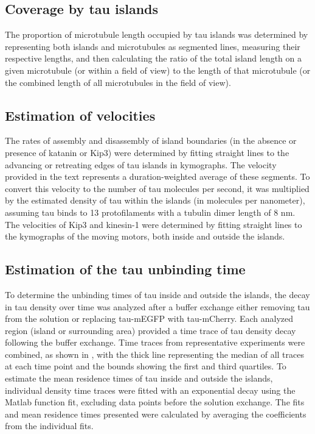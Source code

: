 \subsection{Coverage by tau islands}
The proportion of microtubule length occupied by tau islands was determined by representing both islands and microtubules as segmented lines, measuring their respective lengths, and then calculating the ratio of the total island length on a given microtubule (or within a field of view) to the length of that microtubule (or the combined length of all microtubules in the field of view).

\subsection{Estimation of velocities}
The rates of assembly and disassembly of island boundaries (in the absence or presence of katanin or Kip3) were determined by fitting straight lines to the advancing or retreating edges of tau islands in kymographs. The velocity provided in the text represents a duration-weighted average of these segments. To convert this velocity to the number of tau molecules per second, it was multiplied by the estimated density of tau within the islands (in molecules per nanometer), assuming tau binds to 13 protofilaments with a tubulin dimer length of 8 nm. The velocities of Kip3 and kinesin-1 were determined by fitting straight lines to the kymographs of the moving motors, both inside and outside the islands.

\subsection{Estimation of the tau unbinding time}
To determine the unbinding times of tau inside and outside the islands, the decay in tau density over time was analyzed after a buffer exchange either removing tau from the solution or replacing tau-mEGFP with tau-mCherry. Each analyzed region (island or surrounding area) provided a time trace of tau density decay following the buffer exchange. Time traces from representative experiments were combined, as shown in , with the thick line representing the median of all traces at each time point and the bounds showing the first and third quartiles. To estimate the mean residence times of tau inside and outside the islands, individual density time traces were fitted with an exponential decay using the Matlab function fit, excluding data points before the solution exchange. The fits and mean residence times presented were calculated by averaging the coefficients from the individual fits.

